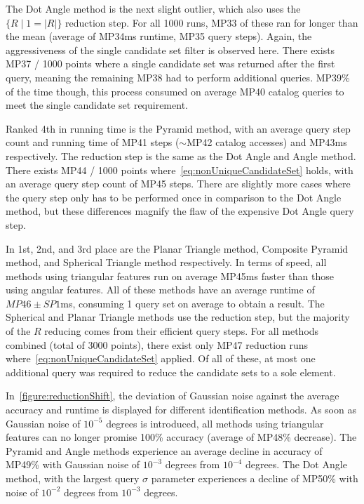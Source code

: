 The Dot Angle method is the next slight outlier, which also uses the $\{ R \mid 1 = |R| \}$ reduction step.
For all 1000 runs, MP33 of these ran for longer than the mean (average of MP34ms runtime, MP35 query steps).
Again, the aggressiveness of the single candidate set filter is observed here.
There exists MP37 / 1000 points where a single candidate set was returned after the first query, meaning the remaining
MP38 had to perform additional queries.
MP39\% of the time though, this process consumed on average MP40 catalog queries to meet the single candidate set
requirement.

Ranked 4th in running time is the Pyramid method, with an average query step count and running time of MP41 steps
($\sim$MP42 catalog accesses) and MP43ms respectively.
The reduction step is the same as the Dot Angle and Angle method.
There exists MP44 / 1000 points where~\autoref{eq:nonUniqueCandidateSet} holds, with an average query step count of
MP45 steps.
There are slightly more cases where the query step only has to be performed once in comparison to the Dot Angle method,
but these differences magnify the flaw of the expensive Dot Angle query step.

In 1st, 2nd, and 3rd place are the Planar Triangle method, Composite Pyramid method, and Spherical Triangle method
respectively.
In terms of speed, all methods using triangular features run on average MP45ms faster than those using angular
features.
All of these methods have an average runtime of $MP46 \pm SP1$ms, consuming 1 query set on average to obtain a result.
The Spherical and Planar Triangle methods use the  reduction step, but the majority of the $R$ reducing
comes from their efficient query steps.
For all methods combined (total of 3000 points), there exist only MP47 reduction runs
where~\autoref{eq:nonUniqueCandidateSet} applied.
Of all of these, at most one additional query was required to reduce the candidate sets to a sole element.

In~\autoref{figure:reductionShift}, the deviation of Gaussian noise against the average accuracy and runtime is
displayed for different identification methods.
As soon as Gaussian noise of $10^{-5}$ degrees is introduced, all methods using triangular features can no longer
promise 100\% accuracy (average of MP48\% decrease).
The Pyramid and Angle methods experience an average decline in accuracy of MP49\% with Gaussian noise of $10^{-3}$
degrees from $10^{-4}$ degrees.
The Dot Angle method, with the largest query $\sigma$ parameter experiences a decline of MP50\% with noise of $10^{-2}$
degrees from $10^{-3}$ degrees.

